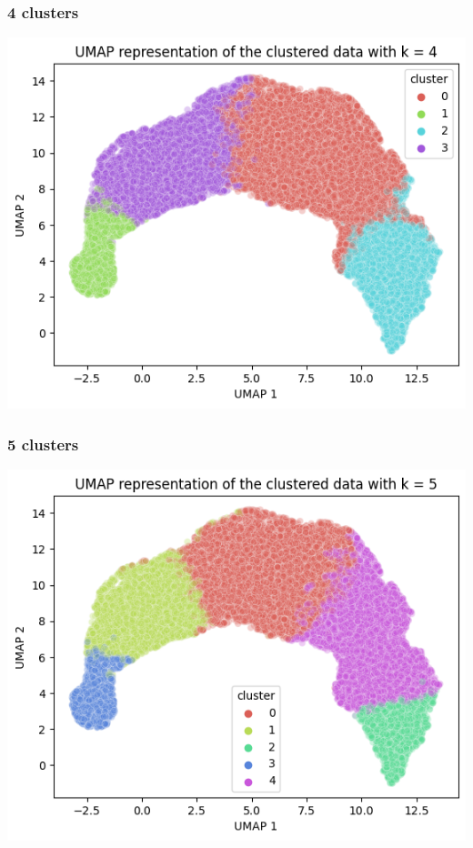 \documentclass{article}
\begin{document}
\subsubsection*{4 clusters}

\begin{center}
    \includegraphics[scale=0.5]{./img/umap_4.png}
\end{center}

\subsubsection*{5 clusters}

\begin{center}
    \includegraphics[scale=0.5]{./img/umap_5.png}
\end{center}
\end{document}
